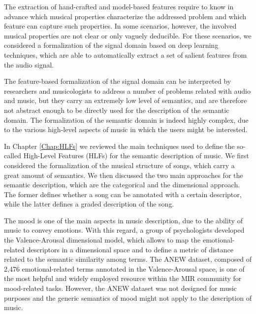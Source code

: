 The extraction of hand-crafted and model-based features require to know in advance which musical properties characterize the addressed problem and which feature can capture such properties. In some scenarios, however, the involved musical properties are not clear or only vaguely deducible. For these scenarios, we considered a formalization of the signal domain based on deep learning techniques, which are able to automatically extract a set of salient features from the audio signal. 

The feature-based formalization of the signal domain can be interpreted by researchers and musicologists to address a number of problems related with audio and music, but they carry an extremely low level of semantics, and are therefore not abstract enough to be directly used for the description of the semantic domain. The formalization of the semantic domain is indeed highly complex, due to the various high-level aspects of music in which the users might be interested. 

In Chapter \ref{Chap:HLFs} we reviewed the main techniques used to define the so-called High-Level Features (HLFs) for the semantic description of music. We first considered the formalization of the musical structure of songs, which carry a great amount of semantics. We then discussed the two main approaches for the semantic description, which are the categorical and the dimensional approach. The former defines whether a song can be annotated with a certain descriptor, while the latter defines a graded description of the song.
%

The mood is one of the main aspects in music description, due to the ability of music to convey emotions. With this regard, a group of psychologists developed the Valence-Arousal dimensional model, which allows to map the emotional-related descriptors in a dimensional space and to define a metric of distance related to the semantic similarity among terms. The ANEW dataset, composed of 2,476 emotional-related terms annotated in the Valence-Arousal space, is one of the most helpful and widely employed resource within the MIR community for mood-related tasks. However, the ANEW dataset was not designed for music purposes and the generic semantics of mood might not apply to the description of music.

